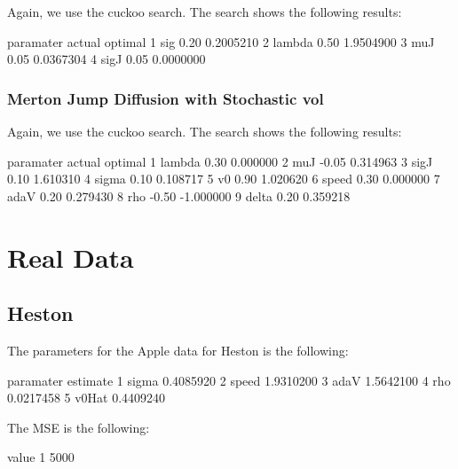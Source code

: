 \documentclass{article}
\begin{document}
Again, we use the cuckoo search. The search shows the following results:

\begin{Schunk}
\begin{Soutput}
  paramater actual   optimal
1       sig   0.20 0.2005210
2    lambda   0.50 1.9504900
3       muJ   0.05 0.0367304
4      sigJ   0.05 0.0000000
\end{Soutput}
\end{Schunk}

\subsubsection{Merton Jump Diffusion with Stochastic vol}

Again, we use the cuckoo search. The search shows the following results:

\begin{Schunk}
\begin{Soutput}
  paramater actual   optimal
1    lambda   0.30  0.000000
2       muJ  -0.05  0.314963
3      sigJ   0.10  1.610310
4     sigma   0.10  0.108717
5        v0   0.90  1.020620
6     speed   0.30  0.000000
7      adaV   0.20  0.279430
8       rho  -0.50 -1.000000
9     delta   0.20  0.359218
\end{Soutput}
\end{Schunk}

\section{Real Data}

\subsection{Heston}

The parameters for the Apple data for Heston is the following:

\begin{Schunk}
\begin{Soutput}
  paramater  estimate
1     sigma 0.4085920
2     speed 1.9310200
3      adaV 1.5642100
4       rho 0.0217458
5     v0Hat 0.4409240
\end{Soutput}
\end{Schunk}

The MSE is the following:

\begin{Schunk}
\begin{Soutput}
  value
1  5000
\end{Soutput}
\end{Schunk}
\end{document}
